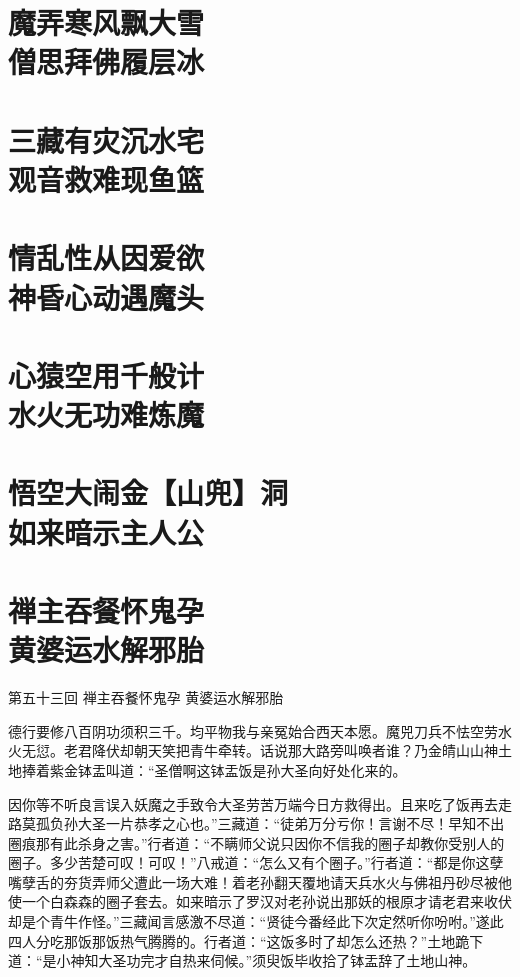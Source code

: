 \documentclass[12pt,UTF8]{ctexbook}
\begin{document}
{\chapter[魔弄寒风飘大雪\ 僧思拜佛履层冰]{魔弄寒风飘大雪\\僧思拜佛履层冰}
\chapter[三藏有灾沉水宅\ 观音救难现鱼篮]{三藏有灾沉水宅\\观音救难现鱼篮}
\chapter[情乱性从因爱欲\ 神昏心动遇魔头]{情乱性从因爱欲\\神昏心动遇魔头}
\chapter[心猿空用千般计\ 水火无功难炼魔]{心猿空用千般计\\水火无功难炼魔}
\chapter[悟空大闹金【山兜】洞\ 如来暗示主人公]{悟空大闹金【山兜】洞\\如来暗示主人公}
\chapter[禅主吞餐怀鬼孕\ 黄婆运水解邪胎]{禅主吞餐怀鬼孕\\黄婆运水解邪胎}

第五十三回 禅主吞餐怀鬼孕 黄婆运水解邪胎

德行要修八百阴功须积三千。均平物我与亲冤始合西天本愿。魔兕刀兵不怯空劳水火无愆。老君降伏却朝天笑把青牛牵转。话说那大路旁叫唤者谁？乃金皘山山神土地捧着紫金钵盂叫道：“圣僧啊这钵盂饭是孙大圣向好处化来的。

因你等不听良言误入妖魔之手致令大圣劳苦万端今日方救得出。且来吃了饭再去走路莫孤负孙大圣一片恭孝之心也。”三藏道：“徒弟万分亏你！言谢不尽！早知不出圈痕那有此杀身之害。”行者道：“不瞒师父说只因你不信我的圈子却教你受别人的圈子。多少苦楚可叹！可叹！”八戒道：“怎么又有个圈子。”行者道：“都是你这孽嘴孽舌的夯货弄师父遭此一场大难！着老孙翻天覆地请天兵水火与佛祖丹砂尽被他使一个白森森的圈子套去。如来暗示了罗汉对老孙说出那妖的根原才请老君来收伏却是个青牛作怪。”三藏闻言感激不尽道：“贤徒今番经此下次定然听你吩咐。”遂此四人分吃那饭那饭热气腾腾的。行者道：“这饭多时了却怎么还热？”土地跪下道：“是小神知大圣功完才自热来伺候。”须臾饭毕收拾了钵盂辞了土地山神。

}
\end{document}
